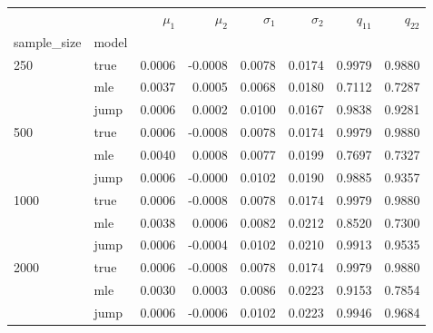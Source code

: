 \begin{tabular}{llrrrrrr}
\toprule
     &      &  $\mu_1$ &  $\mu_2$ &  $\sigma_1$ &  $\sigma_2$ &  $q_{11}$ &  $q_{22}$ \\
sample_size & model &          &          &             &             &           &           \\
\midrule
250  & true &   0.0006 &  -0.0008 &      0.0078 &      0.0174 &    0.9979 &    0.9880 \\
     & mle &   0.0037 &   0.0005 &      0.0068 &      0.0180 &    0.7112 &    0.7287 \\
     & jump &   0.0006 &   0.0002 &      0.0100 &      0.0167 &    0.9838 &    0.9281 \\
500  & true &   0.0006 &  -0.0008 &      0.0078 &      0.0174 &    0.9979 &    0.9880 \\
     & mle &   0.0040 &   0.0008 &      0.0077 &      0.0199 &    0.7697 &    0.7327 \\
     & jump &   0.0006 &  -0.0000 &      0.0102 &      0.0190 &    0.9885 &    0.9357 \\
1000 & true &   0.0006 &  -0.0008 &      0.0078 &      0.0174 &    0.9979 &    0.9880 \\
     & mle &   0.0038 &   0.0006 &      0.0082 &      0.0212 &    0.8520 &    0.7300 \\
     & jump &   0.0006 &  -0.0004 &      0.0102 &      0.0210 &    0.9913 &    0.9535 \\
2000 & true &   0.0006 &  -0.0008 &      0.0078 &      0.0174 &    0.9979 &    0.9880 \\
     & mle &   0.0030 &   0.0003 &      0.0086 &      0.0223 &    0.9153 &    0.7854 \\
     & jump &   0.0006 &  -0.0006 &      0.0102 &      0.0223 &    0.9946 &    0.9684 \\
\bottomrule
\end{tabular}
